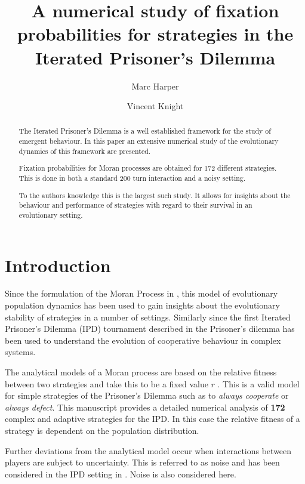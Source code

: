 \documentclass{article}
\title{A numerical study of fixation probabilities for strategies in the
       Iterated Prisoner's Dilemma}
\author{Marc Harper \and Vincent Knight} %
\date{}
\begin{document}
\maketitle

\begin{abstract}
    The Iterated Prisoner's Dilemma is a well established framework for
    the study of emergent behaviour. In this paper an extensive numerical
    study of the evolutionary dynamics of this framework are presented.

    Fixation probabilities for Moran processes are obtained for 172
    different strategies. This is done in both a standard 200 turn
    interaction and a noisy setting.

    To the authors knowledge this is the largest
    such study. It allows for insights about the behaviour and
    performance of strategies with regard to their survival in an
    evolutionary setting.
\end{abstract}  %

\section{Introduction}\label{sec:introduction}

Since the formulation of the Moran Process in \cite{Moran1957}, this model of
evolutionary population dynamics has been used to gain insights about the
evolutionary stability of strategies in a number of settings. Similarly since
the first Iterated Prisoner's Dilemma (IPD) tournament described in
\cite{Axelrod1980a} the Prisoner's dilemma has been used to understand the
evolution of cooperative behaviour in complex systems.

The analytical models of a Moran process are based on the relative fitness
between two strategies and take this to be a fixed value \(r\) \cite{Nowak}.
This is a valid model for simple strategies of the Prisoner's Dilemma such as to
\textit{always cooperate} or \textit{always defect}. This manuscript provides a
detailed numerical analysis of \textbf{172} complex and adaptive strategies for
the IPD\@. In this case the relative fitness of a strategy is dependent on the
population distribution.

Further deviations from the analytical model occur when interactions between
players are subject to uncertainty. This is referred to as noise and has been
considered in the IPD setting in \cite{Bendor1993, Nowak1993, Wu1995}. Noise is
also considered here.
\end{document}
